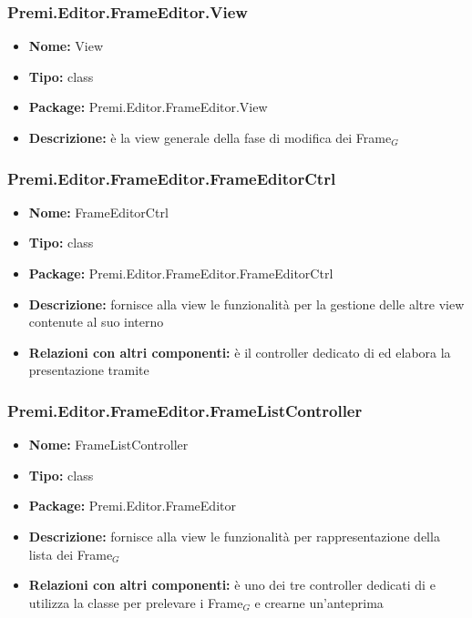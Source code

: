 \subsubsection{Premi.Editor.FrameEditor.View}
\begin{itemize}
  \item \textbf{Nome:} View
  \item \textbf{Tipo:} class
  \item \textbf{Package:} Premi.Editor.FrameEditor.View
  \item \textbf{Descrizione:} è la view generale della fase di modifica dei Frame$_G$
\end{itemize}
\subsubsection{Premi.Editor.FrameEditor.FrameEditorCtrl}
\begin{itemize}
  \item \textbf{Nome:} FrameEditorCtrl
  \item \textbf{Tipo:} class
  \item \textbf{Package:} Premi.Editor.FrameEditor.FrameEditorCtrl
  \item \textbf{Descrizione:} fornisce alla view le funzionalità per la gestione delle altre view contenute al suo interno
  \item \textbf{Relazioni con altri componenti:} è il controller dedicato di   ed elabora la presentazione tramite 
\end{itemize}
\subsubsection{Premi.Editor.FrameEditor.FrameListController}
\begin{itemize}
  \item \textbf{Nome:} FrameListController
  \item \textbf{Tipo:} class
  \item \textbf{Package:} Premi.Editor.FrameEditor
  \item \textbf{Descrizione:} fornisce alla view  le funzionalità per rappresentazione della lista dei Frame$_G$
  \item \textbf{Relazioni con altri componenti:} è uno dei tre controller dedicati di    e utilizza la classe  per prelevare i Frame$_G$ e crearne un'anteprima
\end{itemize}




